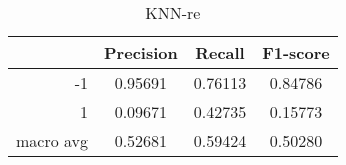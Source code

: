\begin{table}[!h]
    \centering
    \renewcommand{\arraystretch}{1.5}
    \begin{tabular}{|r|c|c|c|}
        \hline
                  & Precision & Recall & F1-score \\ \hline
        -1        &     0.95691     &     0.76113   &    0.84786      \\ \hline
        1         &     0.09671      &     0.42735   &   0.15773       \\ \hline
        macro avg &      0.52681     &     0.59424   &    0.50280      \\ \hline
    \end{tabular}
    \caption{KNN-re}
\end{table}
